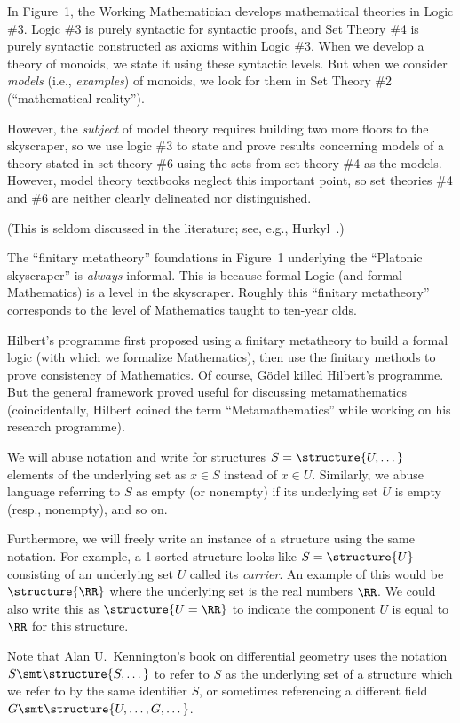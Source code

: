 \begin{remark}
In Figure~1, the Working Mathematician develops mathematical theories
in Logic \#3. Logic \#3 is purely syntactic for syntactic proofs, and
Set Theory \#4 is purely syntactic constructed as axioms within Logic \#3.
When we develop a theory of monoids, we state it using these syntactic
levels. But when we consider \emph{models} (i.e., \emph{examples}) of
monoids, we look for them in Set Theory \#2 (``mathematical reality'').

However, the \emph{subject} of model theory requires building two more
floors to the skyscraper, so we use logic \#3 to state and prove
results concerning models of a theory stated in set theory \#6 using
the sets from set theory \#4 as the models. However, model theory
textbooks neglect this important point, so set theories \#4 and \#6
are neither clearly delineated nor distinguished.

(This is seldom discussed in the literature; see, e.g.,
Hurkyl~\cite{hurkyl2012avoid}.) 
\end{remark}

\begin{remark}
The ``finitary metatheory'' foundations in Figure~1 underlying the
``Platonic skyscraper'' is \emph{always} informal. This is because
formal Logic (and formal Mathematics) is a level in the skyscraper.
Roughly this ``finitary metatheory'' corresponds to the level of
Mathematics taught to ten-year olds.

Hilbert's programme first proposed using a finitary metatheory to
build a formal logic (with which we formalize Mathematics), then use
the finitary methods to prove consistency of Mathematics. Of course,
G\"{o}del killed Hilbert's programme. But the general framework proved
useful for discussing metamathematics (coincidentally, Hilbert coined
the term ``Metamathematics'' while working on his research programme).
\end{remark}

\begin{remark}
We will abuse notation and write for structures $S=\structure{U,\dots}$
elements of the underlying set as $x\in S$ instead of $x\in U$.
Similarly, we abuse language referring to $S$ as empty (or nonempty)
if its underlying set $U$ is empty (resp., nonempty), and so on.

Furthermore, we will freely write an instance of a structure using the
same notation. For example, a 1-sorted structure looks like
$S=\structure{U}$ consisting of an underlying set $U$ called its
\emph{carrier}. An example of this would be $\structure{\RR}$ where
the underlying set is the real numbers $\RR$. We could also write this
as $\structure{U = \RR}$ to indicate the component $U$ is equal to
$\RR$ for this structure.

Note that Alan U.\ Kennington's book on differential geometry uses the
notation $S\smt\structure{S,\dots}$ to refer to $S$ as the underlying
set of a structure which we refer to by the same identifier $S$, or
sometimes referencing a different field $G\smt\structure{U,\dots,G,\dots}$.
\end{remark}

